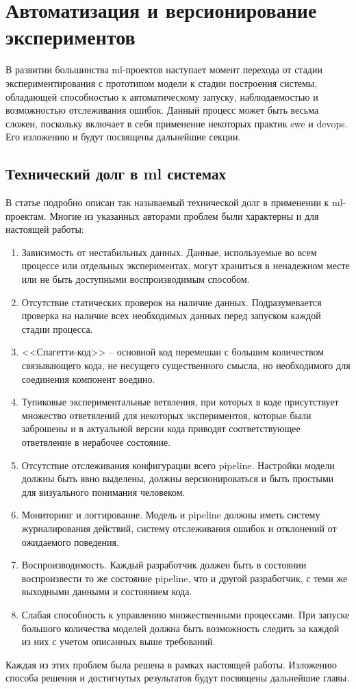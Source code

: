 
\chapter{Автоматизация и версионирование экспериментов}
В развитии большинства \acrshort{ml}-проектов наступает момент перехода от стадии экспериментирования с прототипом модели к стадии построения системы, обладающей способностью к автоматическому запуску, наблюдаемостью и возможностью отслеживания ошибок. 
Данный процесс может быть весьма сложен, поскольку включает в себя применение некоторых практик \gls{swe} и \gls{devops}.
Его изложению и будут посвящены дальнейшие секции.
\section{Технический долг в \acrshort{ml} системах}
\label{sec:ml-debt}
В статье \cite{cite:ml-debt} подробно описан так называемый технической долг в применении к \acrshort{ml}-проектам.
Многие из указанных авторами проблем были характерны и для настоящей работы:
\begin{enumerate}
    \item Зависимость от нестабильных данных.
        Данные, используемые во всем процессе или отдельных экспериментах, могут храниться в ненадежном месте или не быть доступными воспроизводимым способом.
    \item Отсутствие статических проверок на наличие данных.
        Подразумевается проверка на наличие всех необходимых данных перед запуском каждой стадии процесса.
    \item <<Спагетти-код>> -- основной код перемешан с большим количеством связывающего кода, не несущего существенного смысла, но необходимого для соединения компонент воедино.
    \item Тупиковые экспериментальные ветвления, при которых в коде присутствует множество ответвлений для некоторых экспериментов, которые были заброшены и в актуальной версии кода приводят соответствующее ответвление в нерабочее состояние.
    \item Отсутствие отслеживания конфигурации всего \gls{pipeline}.
    Настройки модели должны быть явно выделены, должны версионироваться и быть простыми для визуального понимания человеком.
    \item Мониторинг и логгирование.
        Модель и \gls{pipeline} должны иметь систему журналирования действий, систему отслеживания ошибок и отклонений от ожидаемого поведения.
    \item Воспроизводимость.
        Каждый разработчик должен быть в состоянии воспроизвести то же состояние \gls{pipeline}, что и другой разработчик, с теми же выходными данными и состоянием кода.
    \item Слабая способность к управлению множественными процессами.
        При запуске большого количества моделей должна быть возможность следить за каждой из них с учетом описанных выше требований.
\end{enumerate}
Каждая из этих проблем была решена в рамках настоящей работы.
Изложению способа решения и достигнутых результатов будут посвящены дальнейшие главы.
